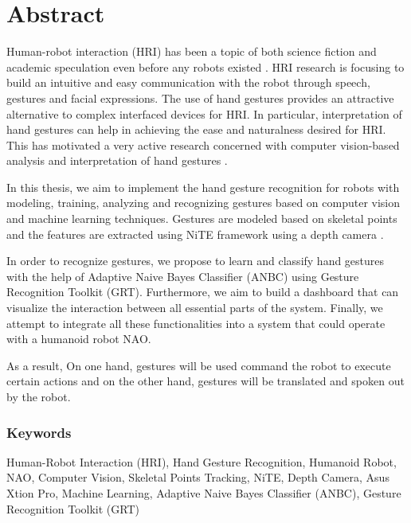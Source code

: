 \chapter*{Abstract} Human-robot interaction (HRI) has been a topic of both science fiction and academic speculation even before any robots existed \cite{1}. HRI research is focusing to build an intuitive and easy communication with the robot through speech, gestures and facial expressions. The use of hand gestures provides an attractive alternative to complex interfaced devices for HRI. In particular, interpretation of hand gestures can help in achieving the ease and naturalness desired for HRI. This has motivated a very active research concerned with computer vision-based analysis and interpretation of hand gestures \cite{2}.

In this thesis, we aim to implement the hand gesture recognition for robots with modeling, training, analyzing and recognizing gestures based on computer vision and machine learning techniques. Gestures are modeled based on skeletal points and the features are extracted using NiTE framework using a depth camera \cite{3}. 

In order to recognize gestures, we propose to learn and classify hand gestures with the help of Adaptive Naive Bayes Classifier (ANBC) using Gesture Recognition Toolkit (GRT). Furthermore, we aim to build a dashboard that can visualize the interaction between all essential parts of the system. Finally, we attempt to integrate all these functionalities into a system that could operate with a humanoid robot NAO.

As a result, On one hand, gestures will be used command the robot to execute certain actions and on the other hand, gestures will be translated and spoken out by the robot. 

\subsection*{Keywords} Human-Robot Interaction (HRI), Hand Gesture Recognition, Humanoid Robot, NAO, Computer Vision, Skeletal Points Tracking, NiTE, Depth Camera, Asus Xtion Pro, Machine Learning, Adaptive Naive Bayes Classifier (ANBC), Gesture Recognition Toolkit (GRT) 
